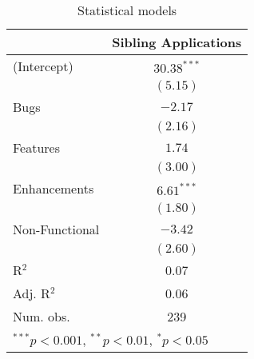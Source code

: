 
\begin{table}
\begin{center}
\begin{tabular}{l c }
\hline
               & Sibling Applications \\
\hline
(Intercept)    & $30.38^{***}$ \\
               & $(5.15)$      \\
Bugs           & $-2.17$       \\
               & $(2.16)$      \\
Features       & $1.74$        \\
               & $(3.00)$      \\
Enhancements   & $6.61^{***}$  \\
               & $(1.80)$      \\
Non-Functional & $-3.42$       \\
               & $(2.60)$      \\
\hline
R$^2$          & 0.07          \\
Adj. R$^2$     & 0.06          \\
Num. obs.      & 239           \\
\hline
\multicolumn{2}{l}{\scriptsize{$^{***}p<0.001$, $^{**}p<0.01$, $^*p<0.05$}}
\end{tabular}
\caption{Statistical models}
\label{table:coefficients}
\end{center}
\end{table}
